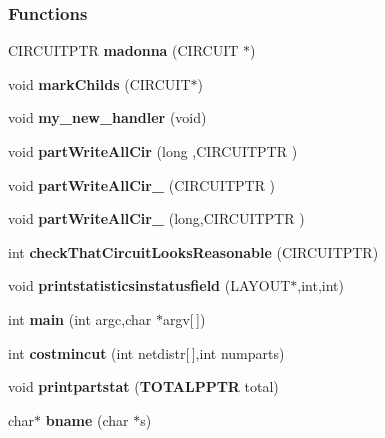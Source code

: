 \subsubsection*{Functions}
\begin{CompactItemize}
\item 
CIRCUITPTR {\bf madonna} (CIRCUIT $\ast$)
\item 
void {\bf mark\-Childs} (CIRCUIT$\ast$)
\item 
void {\bf my\_\-new\_\-handler} (void)
\item 
void {\bf part\-Write\-All\-Cir} (long ,CIRCUITPTR )
\item 
void {\bf part\-Write\-All\-Cir\_} (CIRCUITPTR )
\item 
void {\bf part\-Write\-All\-Cir\_} (long,CIRCUITPTR )
\item 
int {\bf check\-That\-Circuit\-Looks\-Reasonable} (CIRCUITPTR)
\item 
void {\bf printstatisticsinstatusfield} (LAYOUT$\ast$,int,int)
\item 
int {\bf main} (int argc,char $\ast$argv[$\,$])
\item 
int {\bf costmincut} (int netdistr[$\,$],int numparts)
\item 
void {\bf printpartstat} ({\bf TOTALPPTR} total)
\item 
char$\ast$ {\bf bname} (char $\ast$s)
\end{CompactItemize}
